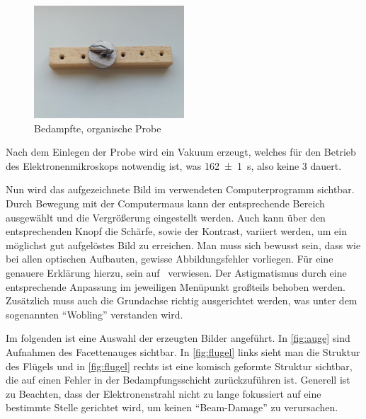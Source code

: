 \documentclass[12pt,english,ngerman]{scrartcl}
\begin{document}
\begin{figure}[H]
	\begin{center}
		\includegraphics[width =0.5\textwidth]{./figures/probe.png}
	\end{center}
	\caption[Bedampfte, organische Probe] {Bedampfte, organische Probe~\cite{sein_foto}
	}\label{fig:probe}
\end{figure}

Nach dem Einlegen der Probe wird ein Vakuum erzeugt, welches für den Betrieb
des Elektronenmikroskops notwendig ist, was \SI{162(1)}{\s}, also keine
\SI{3}{\min} dauert.

Nun wird das aufgezeichnete Bild im verwendeten Computerprogramm sichtbar.
Durch Bewegung mit der Computermaus kann der entsprechende Bereich ausgewählt
und die Vergrößerung eingestellt werden. Auch kann über den entsprechenden
Knopf die Schärfe, sowie der Kontrast, variiert werden, um ein möglichst gut
aufgelöstes Bild zu erreichen. Man muss sich bewusst sein, dass wie bei allen
optischen Aufbauten, gewisse Abbildungsfehler vorliegen. Für eine genauere
Erklärung hierzu, sein auf~\cite{unterlagen} verwiesen. Der Astigmatismus durch
eine entsprechende Anpassung im jeweiligen Menüpunkt großteils behoben werden.
Zusätzlich muss auch die Grundachse richtig ausgerichtet werden, was unter dem
sogenannten ``Wobling'' verstanden wird.

Im folgenden ist eine Auswahl der erzeugten Bilder angeführt. In
\autoref{fig:auge} sind Aufnahmen des Facettenauges sichtbar. In
\autoref{fig:flugel} links sieht man die Struktur des Flügels und in
\autoref{fig:flugel} rechts ist eine komisch geformte Struktur sichtbar, die
auf einen Fehler in der Bedampfungsschicht zurückzuführen ist. Generell ist zu
Beachten, dass der Elektronenstrahl nicht zu lange fokussiert auf eine
bestimmte Stelle gerichtet wird, um keinen ``Beam-Damage'' zu verursachen.
\end{document}
